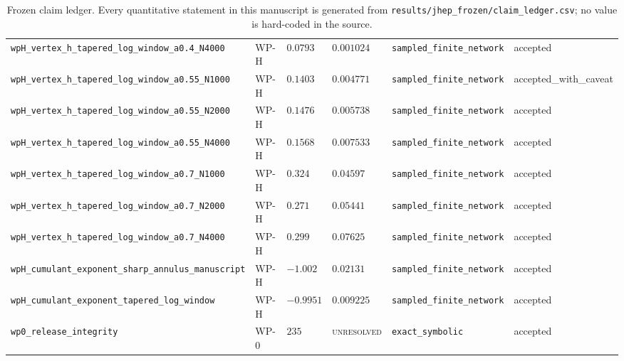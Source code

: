 \begin{table}[t]
\begin{tabular}{@{}llllll@{}}
\texttt{wpH\_vertex\_h\_tapered\_log\_window\_a0.4\_N4000} & WP-H & $0.0793$ & $0.001024$ & \texttt{sampled\_finite\_network} & accepted \\
\texttt{wpH\_vertex\_h\_tapered\_log\_window\_a0.55\_N1000} & WP-H & $0.1403$ & $0.004771$ & \texttt{sampled\_finite\_network} & accepted\_with\_caveat \\
\texttt{wpH\_vertex\_h\_tapered\_log\_window\_a0.55\_N2000} & WP-H & $0.1476$ & $0.005738$ & \texttt{sampled\_finite\_network} & accepted \\
\texttt{wpH\_vertex\_h\_tapered\_log\_window\_a0.55\_N4000} & WP-H & $0.1568$ & $0.007533$ & \texttt{sampled\_finite\_network} & accepted \\
\texttt{wpH\_vertex\_h\_tapered\_log\_window\_a0.7\_N1000} & WP-H & $0.324$ & $0.04597$ & \texttt{sampled\_finite\_network} & accepted \\
\texttt{wpH\_vertex\_h\_tapered\_log\_window\_a0.7\_N2000} & WP-H & $0.271$ & $0.05441$ & \texttt{sampled\_finite\_network} & accepted \\
\texttt{wpH\_vertex\_h\_tapered\_log\_window\_a0.7\_N4000} & WP-H & $0.299$ & $0.07625$ & \texttt{sampled\_finite\_network} & accepted \\
\texttt{wpH\_cumulant\_exponent\_sharp\_annulus\_manuscript} & WP-H & $-1.002$ & $0.02131$ & \texttt{sampled\_finite\_network} & accepted \\
\texttt{wpH\_cumulant\_exponent\_tapered\_log\_window} & WP-H & $-0.9951$ & $0.009225$ & \texttt{sampled\_finite\_network} & accepted \\
\texttt{wp0\_release\_integrity} & WP-0 & $235$ & \textsc{unresolved} & \texttt{exact\_symbolic} & accepted \\
\bottomrule
\end{tabular}
\caption{Frozen claim ledger. Every quantitative statement in this manuscript is generated from \texttt{results/jhep\_frozen/claim\_ledger.csv}; no value is hard-coded in the source.}
\label{tab:claim-ledger}
\end{table}
